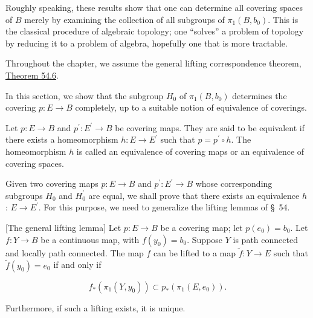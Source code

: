 Roughly speaking, these results show that one can determine all covering spaces of \(B\) merely by examining the collection of all subgroups of \({\pi }_{1}( {B,b_{0}})\). This is the classical procedure of algebraic topology; one ``solves'' a problem of topology by reducing it to a problem of algebra, hopefully one that is more tractable.

Throughout the chapter, we assume the general lifting correspondence theorem, \hyperref[thm:54.6]{Theorem 54.6}.


In this section, we show that the subgroup \(H_{0}\) of \({\pi }_{1}( {B,b_{0}})\) determines the covering \(p : E \rightarrow B\) completely, up to a suitable notion of equivalence of coverings.

\begin{definition}
	Let \(p : E \rightarrow B\) and \(p^{\prime } : E^{\prime } \rightarrow B\) be covering maps. They are said to be equivalent if there exists a homeomorphism \(h : E \rightarrow {E}^{\prime }\) such that \(p = p^{\prime } \circ h\). The homeomorphism \(h\) is called an equivalence of covering maps or an equivalence of covering spaces.
\end{definition}

\par\nopagebreak
\begin{center}
	\label{fig:com_79_def}
\end{center}
\par\nopagebreak

Given two covering maps \(p : E \rightarrow B\) and \(p^{\prime } : E^{\prime } \rightarrow B\) whose corresponding subgroups \(H_{0}\) and \(H_0^{\prime }\) are equal, we shall prove that there exists an equivalence \(h\) : \(E \rightarrow {E}^{\prime }\). For this purpose, we need to generalize the lifting lemmas of \S\ 54.

\begin{lemma}
\label{lem:\thetheorem}[The general lifting lemma]
	Let \(p : E \rightarrow B\) be a covering map; let \(p( e_{0}) = b_{0}\). Let \(f : Y \rightarrow B\) be a continuous map, with \(f( y_{0}) = b_{0}\). Suppose \(Y\) is path connected and locally path connected. The map \(f\) can be lifted to a map \(\widetilde{f} : Y \rightarrow E\) such that \(\widetilde{f}( y_{0}) = e_{0}\) if and only if

\[
f_{ * }( {{\pi }_{1}( {Y,y_{0}}) }) \subset {p}_{ * }( {{\pi }_{1}( {E,e_{0}}) }).
\]

Furthermore, if such a lifting exists, it is unique.
\end{lemma}

